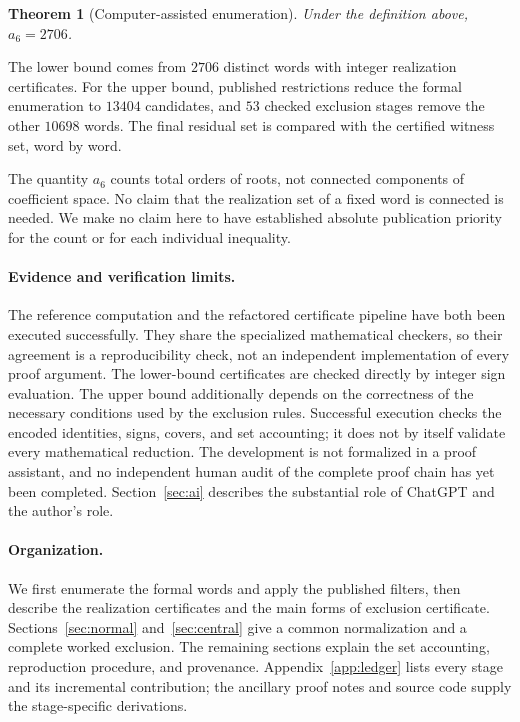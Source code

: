 \documentclass[11pt]{article}
\newtheorem{theorem}{Theorem}[section]
\theoremstyle{definition}
\begin{document}
\begin{theorem}[Computer-assisted enumeration]\label{thm:main}
Under the definition above, $a_6=2706$.
\end{theorem}

The lower bound comes from $2706$ distinct words with integer
realization certificates. For the upper bound, published restrictions
reduce the formal enumeration to $13404$ candidates, and $53$ checked
exclusion stages remove the other $10698$ words. The final residual set
is compared with the certified witness set, word by word.

The quantity $a_6$ counts total orders of roots, not connected components
of coefficient space. No claim that the realization set of a fixed word
is connected is needed. We make no claim here to have established
absolute publication priority for the count or for each individual
inequality.

\paragraph{Evidence and verification limits.}
The reference computation and the refactored certificate pipeline have
both been executed successfully. They share the specialized mathematical
checkers, so their agreement is a reproducibility check, not an
independent implementation of every proof argument. The lower-bound
certificates are checked directly by integer sign evaluation. The
upper bound additionally depends on the correctness of the necessary
conditions used by the exclusion rules. Successful execution checks the
encoded identities, signs, covers, and set accounting; it does not by
itself validate every mathematical reduction. The development is not
formalized in a proof assistant, and no independent human audit of the
complete proof chain has yet been completed. Section~\ref{sec:ai}
describes the substantial role of ChatGPT and the author's role.

\paragraph{Organization.}
We first enumerate the formal words and apply the published filters,
then describe the realization certificates and the main forms of
exclusion certificate. Sections~\ref{sec:normal} and~\ref{sec:central}
give a common normalization and a complete worked exclusion.
The remaining sections explain the set accounting, reproduction
procedure, and provenance. Appendix~\ref{app:ledger} lists every stage
and its incremental contribution; the ancillary proof notes and source
code supply the stage-specific derivations.
\end{document}
